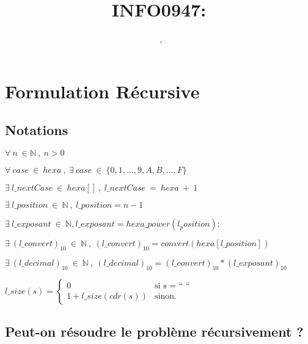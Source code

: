 \documentclass[a4paper, 11pt, oneside]{article}
\title{INFO0947: \intitule}
\author{\textsc{\Prenom}~\textsc{\Nom}, \matricule}
\date{}
\newcommand{\tablemat}{~}
\renewcommand{\tablemat}{\tableofcontents}
\begin{document}
\maketitle
\newpage
\tablemat
\newpage


\section{Formulation Récursive}\label{formulation}

	\subsection{Notations}	
	
	$\forall ~ n ~ \in \mathbb{N} ~ , ~ n > 0 $
	\vspace{2mm}
	
	$\forall ~ case ~ \in ~ hexa ~ , ~ \exists ~ case ~ \in ~ \{0, 1, \ldots , 9, A, B, \ldots , F\}$
	\vspace{2mm}
	
	$\exists ~ l\_nextCase ~ \in ~ hexa[] ~ , ~ l\_nextCase ~ = ~ hexa ~ + ~ 1 $
	\vspace{2mm}
	
	$\exists ~ l\_position ~ \in ~ \mathbb{N} ~ , ~ l\_position = n - 1$
	\vspace{2mm}
	
	$\exists ~ l\_exposant ~ \in ~ \mathbb{N} , l\_exposant = hexa\_power(l_position);$
	\vspace{2mm}
	
	$\exists ~ (l\_convert)_{10} ~ \in ~ \mathbb{N} ~ , ~ (l\_convert)_{10} = convert(hexa[l\_position]) $
	\vspace{2mm}
	
	$\exists ~ (l\_decimal)_{10} ~ \in ~ \mathbb{N} ~ , ~ (l\_decimal)_{10} = (l\_convert)_{10} * (l\_exposant)_{10}$
	\vspace{2mm}
	
	$
	l\_size(s) = \left\{
	\begin{array}{ll}
    		0 & \mbox{si s = `` `` }  \\
    		1 + l\_size(cdr(s)) & \mbox{sinon.}
	\end{array}
	\right.
	$
	
	\subsection{Peut-on résoudre le problème récursivement ?}
	
\end{document}
